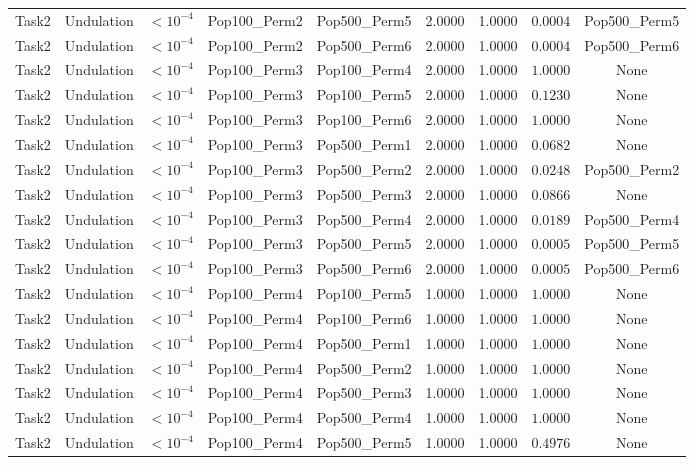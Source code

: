 \documentclass[8pt]{article}
\begin{document}
\begin{longtable}{llccccccc}
Task2 & Undulation & $< 10^{-4}$ & Pop100\_Perm2 & Pop500\_Perm5 & 2.0000 & 1.0000 & $0.0004$ & Pop500\_Perm5 \\
Task2 & Undulation & $< 10^{-4}$ & Pop100\_Perm2 & Pop500\_Perm6 & 2.0000 & 1.0000 & $0.0004$ & Pop500\_Perm6 \\
Task2 & Undulation & $< 10^{-4}$ & Pop100\_Perm3 & Pop100\_Perm4 & 2.0000 & 1.0000 & $1.0000$ & None \\
Task2 & Undulation & $< 10^{-4}$ & Pop100\_Perm3 & Pop100\_Perm5 & 2.0000 & 1.0000 & $0.1230$ & None \\
Task2 & Undulation & $< 10^{-4}$ & Pop100\_Perm3 & Pop100\_Perm6 & 2.0000 & 1.0000 & $1.0000$ & None \\
Task2 & Undulation & $< 10^{-4}$ & Pop100\_Perm3 & Pop500\_Perm1 & 2.0000 & 1.0000 & $0.0682$ & None \\
Task2 & Undulation & $< 10^{-4}$ & Pop100\_Perm3 & Pop500\_Perm2 & 2.0000 & 1.0000 & $0.0248$ & Pop500\_Perm2 \\
Task2 & Undulation & $< 10^{-4}$ & Pop100\_Perm3 & Pop500\_Perm3 & 2.0000 & 1.0000 & $0.0866$ & None \\
Task2 & Undulation & $< 10^{-4}$ & Pop100\_Perm3 & Pop500\_Perm4 & 2.0000 & 1.0000 & $0.0189$ & Pop500\_Perm4 \\
Task2 & Undulation & $< 10^{-4}$ & Pop100\_Perm3 & Pop500\_Perm5 & 2.0000 & 1.0000 & $0.0005$ & Pop500\_Perm5 \\
Task2 & Undulation & $< 10^{-4}$ & Pop100\_Perm3 & Pop500\_Perm6 & 2.0000 & 1.0000 & $0.0005$ & Pop500\_Perm6 \\
Task2 & Undulation & $< 10^{-4}$ & Pop100\_Perm4 & Pop100\_Perm5 & 1.0000 & 1.0000 & $1.0000$ & None \\
Task2 & Undulation & $< 10^{-4}$ & Pop100\_Perm4 & Pop100\_Perm6 & 1.0000 & 1.0000 & $1.0000$ & None \\
Task2 & Undulation & $< 10^{-4}$ & Pop100\_Perm4 & Pop500\_Perm1 & 1.0000 & 1.0000 & $1.0000$ & None \\
Task2 & Undulation & $< 10^{-4}$ & Pop100\_Perm4 & Pop500\_Perm2 & 1.0000 & 1.0000 & $1.0000$ & None \\
Task2 & Undulation & $< 10^{-4}$ & Pop100\_Perm4 & Pop500\_Perm3 & 1.0000 & 1.0000 & $1.0000$ & None \\
Task2 & Undulation & $< 10^{-4}$ & Pop100\_Perm4 & Pop500\_Perm4 & 1.0000 & 1.0000 & $1.0000$ & None \\
Task2 & Undulation & $< 10^{-4}$ & Pop100\_Perm4 & Pop500\_Perm5 & 1.0000 & 1.0000 & $0.4976$ & None \\

\end{longtable}
\end{document}
